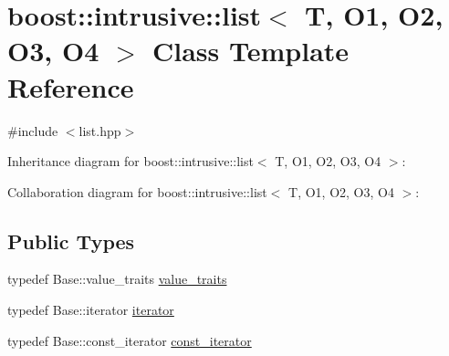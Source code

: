 \hypertarget{classboost_1_1intrusive_1_1list}{}\section{boost\+:\+:intrusive\+:\+:list$<$ T, O1, O2, O3, O4 $>$ Class Template Reference}
\label{classboost_1_1intrusive_1_1list}


{\ttfamily \#include $<$list.\+hpp$>$}



Inheritance diagram for boost\+:\+:intrusive\+:\+:list$<$ T, O1, O2, O3, O4 $>$\+:


Collaboration diagram for boost\+:\+:intrusive\+:\+:list$<$ T, O1, O2, O3, O4 $>$\+:
\subsection*{Public Types}
\begin{DoxyCompactItemize}
\item 
typedef Base\+::value\+\_\+traits \hyperlink{classboost_1_1intrusive_1_1list_aed9db2882c7567d4600fce5dda67c0ab}{value\+\_\+traits}
\item 
typedef Base\+::iterator \hyperlink{classboost_1_1intrusive_1_1list_a3b53513ff4e214951fc767223097fb6e}{iterator}
\item 
typedef Base\+::const\+\_\+iterator \hyperlink{classboost_1_1intrusive_1_1list_a4a837c7b342e3461c2a8ed48df5dd9a3}{const\+\_\+iterator}
\end{DoxyCompactItemize}

